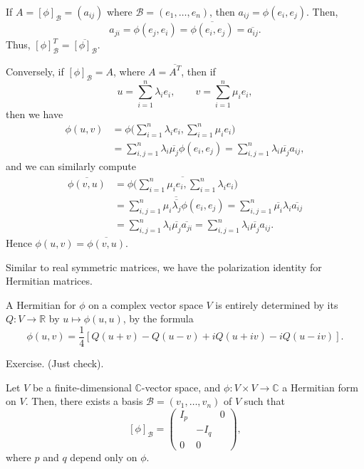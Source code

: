 \documentclass[12pt]{article}
\begin{document}
\begin{proofbox}
	If $A = [\phi]_{\mathcal{B}} = (a_{ij})$ where $\mathcal{B} = (e_1, \ldots, e_n)$, then $a_{ij} = \phi(e_i, e_j)$. Then,
	\[
	a_{ji} = \phi(e_j, e_i) = \overline{\phi(e_i, e_j)} = \overline{a_{ij}}
	.\]
	Thus, $[\phi]_{\mathcal{B}}^{T} = \overline{[\phi]_{\mathcal{B}}}$.

	Conversely, if $[\phi]_{\mathcal{B}} = A$, where $A = \overline{A^{T}}$, then if
	\[
	u = \sum_{i = 1}^{n} \lambda_i e_i, \qquad v = \sum_{i = 1}^{n} \mu_i e_i
	,\]
	then we have
	\begin{align*}
		\phi(u, v) &= \phi \Biggl( \sum_{i = 1}^{n} \lambda_i e_i , \sum_{i = 1}^{n} \mu_i e_i \Biggr) \\
			   &= \sum_{i,j = 1}^{n} \lambda_i \overline{\mu_j} \phi(e_i, e_j) = \sum_{i, j = 1}^{n} \lambda_i \overline{\mu_j} a_{ij},
	\end{align*}
	and we can similarly compute
	\begin{align*}
		\overline{\phi(v, u)} &= \overline{\phi \Biggl( \sum_{i = 1}^{n} \mu_i e_i, \sum_{i = 1}^{n} \lambda_i e_i \Biggr)} \\
		&= \overline{\sum_{i,j = 1}^{n} \mu_i \overline{\lambda_j}\phi(e_i, e_j)} = \sum_{i,j = 1}^{n} \overline{\mu_i}\lambda_i \overline{a_{ij}} \\
		&= \sum_{i, j = 1}^{n} \lambda_i \overline{\mu_j} \overline{a_{ji}} = \sum_{i, j = 1}^{n}\lambda_i \overline{\mu_j} a_{ij}.
	\end{align*}
	Hence $\phi(u, v) = \overline{\phi(v, u)}$.
\end{proofbox}

Similar to real symmetric matrices, we have the polarization identity for Hermitian matrices.

\begin{proposition}
	A Hermitian for $\phi$ on a complex vector space $V$ is entirely determined by its $Q : V \to \mathbb{R}$ by $u \mapsto \phi(u, u)$, by the formula
	\[
		\phi(u, v) = \frac{1}{4} [Q(u+v) - Q(u-v) + iQ(u+iv) - iQ(u-iv)]
	.\]
\end{proposition}

\begin{proofbox}
	Exercise. (Just check).
\end{proofbox}

\begin{theorem}
	Let $V$ be a finite-dimensional $\mathbb{C}$-vector space, and $\phi : V \times V \to \mathbb{C}$ a Hermitian form on $V$. Then, there exists a basis $\mathcal{B} = (v_1, \ldots, v_n)$ of $V$ such that
	\[
		[\phi]_{\mathcal{B}} =
		\begin{pmatrix}
			I_p & & 0 \\
			    & -I_q & \\
			0 & 0
		\end{pmatrix}
	,\]
	where $p$ and $q$ depend only on $\phi$.
\end{theorem}
\end{document}
